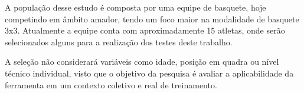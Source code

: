 \label{sec:esboco-projeto-pratica}

A população desse estudo é composta por uma equipe de basquete, hoje competindo em âmbito amador, tendo um foco maior na modalidade de basquete 3x3. Atualmente a equipe conta com aproximadamente 15 atletas, onde serão selecionados alguns para a realização dos
testes deste trabalho.

A seleção não considerará variáveis como idade, posição em quadra ou nível técnico individual, visto que o objetivo da pesquisa é avaliar a aplicabilidade da ferramenta em um contexto coletivo e real de treinamento.






